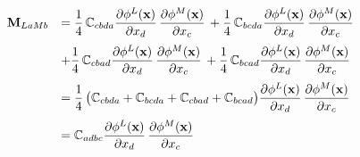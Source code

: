 \begin{equation*}
  \begin{array}{lll}
    \bfM_{LaMb} &= \dfrac14\mathbb{C}_{cbda}\p{\phi^L(\bfx)}{x_{d}}\p{\phi^M(\bfx)}{x_{c}}
    + \dfrac14\mathbb{C}_{bcda}\p{\phi^L(\bfx)}{x_{d}}\p{\phi^M(\bfx)}{x_{c}}\\[4mm]
    &+ \dfrac14\mathbb{C}_{cbad}\p{\phi^L(\bfx)}{x_{d}}\p{\phi^M(\bfx)}{x_{c}}
    + \dfrac14\mathbb{C}_{bcad}\p{\phi^L(\bfx)}{x_{d}}\p{\phi^M(\bfx)}{x_{c}}\\[4mm]
    &= \dfrac14\big(\mathbb{C}_{cbda} + \mathbb{C}_{bcda} + \mathbb{C}_{cbad} + \mathbb{C}_{bcad}\big) \p{\phi^L(\bfx)}{x_{d}}\p{\phi^M(\bfx)}{x_{c}}\\[4mm]
    &= \mathbb{C}_{adbc}\p{\phi^L(\bfx)}{x_{d}}\p{\phi^M(\bfx)}{x_{c}}\\[4mm]
  \end{array}
\end{equation*}

